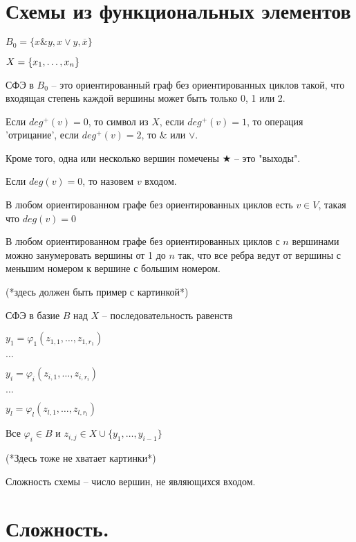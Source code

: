 \section{Схемы из функциональных элементов}

$B_0 = \{x \& y, x \vee y, \overline{x}\}$  

$X = \{x_1, \ldots, x_n\}$

СФЭ в $B_0$ -- это ориентированный граф без ориентированных циклов такой, что входящая степень каждой вершины может быть только 0, 1 или 2.

Если $deg^{+}(v) = 0$, то символ из $X$, если $deg^{+}(v) = 1$, то операция 'отрицание', если $deg^{+}(v) = 2$, то $\&$ или $\vee$.

Кроме того, одна или несколько вершин помечены $\bigstar$  -- это "выходы".

Если $deg(v) = 0$, то назовем $v$ входом.

\begin{stm}
	В любом ориентированном графе без ориентированных циклов есть $v \in V$, такая что $deg(v) = 0$
\end{stm}

\begin{stm}
	В любом ориентированном графе без ориентированных циклов с $n$ вершинами можно занумеровать вершины от 1 до $n$ так, что все ребра ведут от вершины с меньшим номером к вершине с большим номером.
\end{stm}

(*здесь должен быть пример с картинкой*)


СФЭ в базие $B$ над $X$ -- последовательность равенств

$y_1 = \varphi_1(z_{1,1}, \ldots, z_{1,r_1})$ 

$ \ldots$

$y_i = \varphi_i(z_{i,1}, \ldots, z_{i,r_i})$ 

$\ldots$

$ y_l = \varphi_l(z_{l,1}, \ldots, z_{l,r_l})$

Все $\varphi_i \in B$ и $z_{i,j} \in X \cup \{y_1, \ldots, y_{i - 1}\}$

(*Здесь тоже не хватает картинки*)

\begin{df}
	Сложность схемы -- число вершин, не являющихся входом.
\end{df}

\section{Сложность.}

	